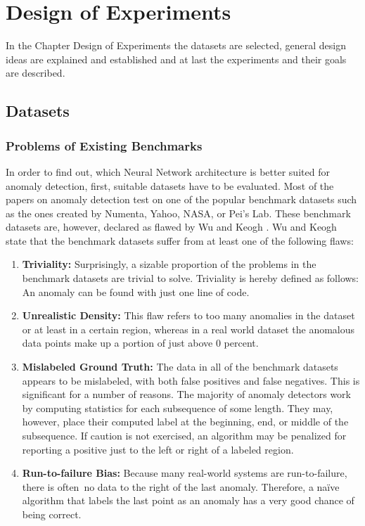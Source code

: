 \chapter{Design of Experiments}
In the Chapter Design of Experiments the datasets are selected, general design ideas are explained and established and at last the experiments and their goals are described.

\section{Datasets}


\subsection{Problems of Existing Benchmarks} \label{Problems of Existing Benchmarks}
In order to find out, which Neural Network architecture is better suited for anomaly detection, first, suitable datasets have to be evaluated. Most of the papers on anomaly detection test on one of the popular benchmark datasets such as the ones created by Numenta, Yahoo, NASA, or Pei's Lab. These benchmark datasets are, however, declared as flawed by Wu and Keogh \parencite{YEAR}. Wu and Keogh state that the benchmark datasets suffer from at least one of the following flaws:

\begin{enumerate}
	\item \textbf{Triviality:} Surprisingly, a sizable proportion of the problems in the benchmark datasets are trivial to solve. Triviality is hereby defined as follows: An anomaly can be found with just one line of code.
	\item \textbf{Unrealistic Density:} This flaw refers to too many anomalies in the dataset or at least in a certain region, whereas in a real world dataset the anomalous data points make up a portion of just above 0 percent.   
	\item \textbf{Mislabeled Ground Truth:} The data in all of the benchmark datasets appears to be mislabeled, with both false positives and false negatives. This is significant for a number of reasons. The majority of anomaly detectors work by computing statistics for each subsequence of some length. They may, however, place their computed label at the beginning, end, or middle of the subsequence. If caution is not exercised, an algorithm may be penalized for reporting a positive just to the left or right of a labeled region.
	\item \textbf{Run-to-failure Bias:} Because many real-world systems are run-to-failure, there is often no data to the right of the last anomaly. Therefore, a naïve algorithm that labels the last point as an anomaly has a very good chance of being correct.
\end{enumerate}

